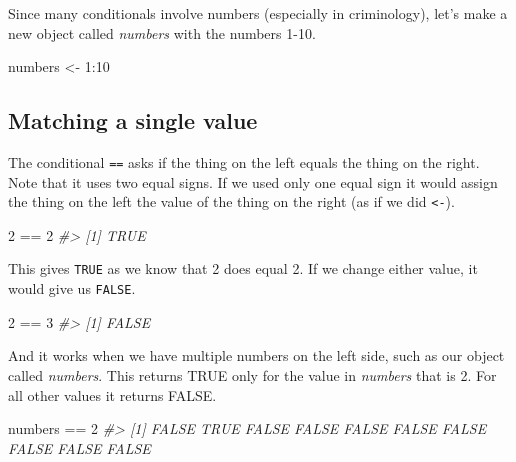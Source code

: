 \documentclass[
]{krantz}
\makeatletter
\newenvironment{Shaded}{\begin{snugshade}}{\end{snugshade}}
\newcommand{\CommentTok}[1]{\textcolor[rgb]{0.37,0.37,0.37}{\textit{#1}}}
\newcommand{\DecValTok}[1]{\textcolor[rgb]{0.06,0.06,0.06}{#1}}
\newcommand{\NormalTok}[1]{#1}
\newcommand{\OtherTok}[1]{\textcolor[rgb]{0.37,0.37,0.37}{#1}}
\newcommand{\SpecialCharTok}[1]{\textcolor[rgb]{0,0,0}{#1}}
\newenvironment{kframe}{%
\medskip{}
\setlength{\fboxsep}{.8em}
 \def\at@end@of@kframe{}%
 \ifinner\ifhmode%
  \def\at@end@of@kframe{\end{minipage}}%
  \begin{minipage}{\columnwidth}%
 \fi\fi%
 \def\FrameCommand##1{\hskip\@totalleftmargin \hskip-\fboxsep
 \colorbox{shadecolor}{##1}\hskip-\fboxsep
     \hskip-\linewidth \hskip-\@totalleftmargin \hskip\columnwidth}%
 \MakeFramed {\advance\hsize-\width
   \@totalleftmargin\z@ \linewidth\hsize
   \@setminipage}}%
 {\par\unskip\endMakeFramed%
 \at@end@of@kframe}
\renewenvironment{Shaded}{\begin{kframe}}{\end{kframe}}
\makeatother
\begin{document}
Since many conditionals involve numbers (especially in criminology), let's make a new object called \emph{numbers} with the numbers 1-10.

\begin{Shaded}
\begin{Highlighting}[]
\NormalTok{numbers }\OtherTok{\textless{}{-}} \DecValTok{1}\SpecialCharTok{:}\DecValTok{10}
\end{Highlighting}
\end{Shaded}

\hypertarget{matching-a-single-value}{%
\subsection{Matching a single value}\label{matching-a-single-value}}

The conditional \texttt{==} asks if the thing on the left equals the thing on the right. Note that it uses two equal signs. If we used only one equal sign it would assign the thing on the left the value of the thing on the right (as if we did \texttt{\textless{}-}).

\begin{Shaded}
\begin{Highlighting}[]
\DecValTok{2} \SpecialCharTok{==} \DecValTok{2}
\CommentTok{\#\textgreater{} [1] TRUE}
\end{Highlighting}
\end{Shaded}

This gives \texttt{TRUE} as we know that 2 does equal 2. If we change either value, it would give us \texttt{FALSE}.

\begin{Shaded}
\begin{Highlighting}[]
\DecValTok{2} \SpecialCharTok{==} \DecValTok{3}
\CommentTok{\#\textgreater{} [1] FALSE}
\end{Highlighting}
\end{Shaded}

And it works when we have multiple numbers on the left side, such as our object called \emph{numbers}. This returns TRUE only for the value in \emph{numbers} that is 2. For all other values it returns FALSE.

\begin{Shaded}
\begin{Highlighting}[]
\NormalTok{numbers }\SpecialCharTok{==} \DecValTok{2}
\CommentTok{\#\textgreater{}  [1] FALSE  TRUE FALSE FALSE FALSE FALSE FALSE FALSE FALSE FALSE}
\end{Highlighting}
\end{Shaded}
\end{document}
